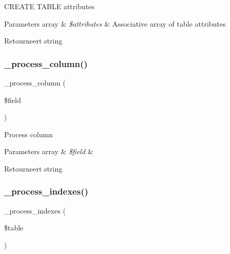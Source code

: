 C\+R\+E\+A\+TE T\+A\+B\+LE attributes


\begin{DoxyParams}[1]{Parameters}
array & {\em \$attributes} & Associative array of table attributes \\
\hline
\end{DoxyParams}
\begin{DoxyReturn}{Retourneert}
string 
\end{DoxyReturn}
\mbox{\label{class_c_i___d_b__mysql__forge_a8f38f1c5b5dddecca4befbe393f3f299}} 
\subsubsection{\texorpdfstring{\_process\_column()}{\_process\_column()}}
{\footnotesize\ttfamily \+\_\+process\+\_\+column (\begin{DoxyParamCaption}\item[{}]{\$field }\end{DoxyParamCaption})\hspace{0.3cm}{\ttfamily [protected]}}

Process column


\begin{DoxyParams}[1]{Parameters}
array & {\em \$field} & \\
\hline
\end{DoxyParams}
\begin{DoxyReturn}{Retourneert}
string 
\end{DoxyReturn}
\mbox{\label{class_c_i___d_b__mysql__forge_ae0bdb4ea3418590d1894c5b621b5ca50}} 
\subsubsection{\texorpdfstring{\_process\_indexes()}{\_process\_indexes()}}
{\footnotesize\ttfamily \+\_\+process\+\_\+indexes (\begin{DoxyParamCaption}\item[{}]{\$table }\end{DoxyParamCaption})\hspace{0.3cm}{\ttfamily [protected]}}


